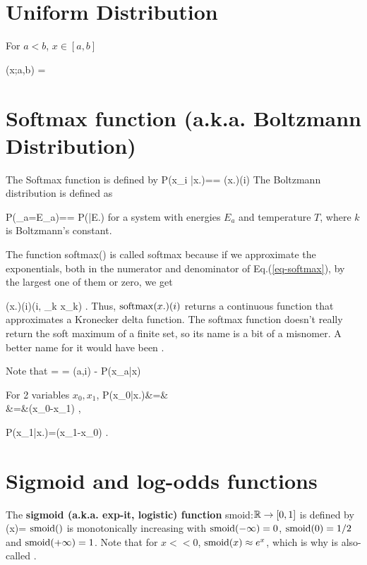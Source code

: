 \section{Uniform Distribution}
For $a<b$, $x\in [a,b]$

\beq
\calu(x;a,b) =
\eeq

\section {Softmax function
(a.k.a. Boltzmann Distribution)}

The Softmax function
 is defined by
\beq
P(x_i
|x.)==
\softmax(x.)(i)
\label{eq-softmax}
\eeq
The
Boltzmann distribution is defined as

\beq
P(\rvE_a=E_a)==
P(|E.)\eeq
for a system with energies $E_a$
and temperature $T$,
where $k$
is Boltzmann's constant.

The function
softmax() is called softmax because if we
approximate the exponentials,
 both in the numerator and denominator
of Eq.(\ref{eq-softmax}),
by the largest one
of them or zero,
we get

\beq
\softmax(x.)(i)\approx \delta(i, \argmax_k x_k)
\;.
\eeq
Thus, ${\rm softmax}(x.)(i)$
returns a continuous
function that approximates a
Kronecker delta function.
The softmax function doesn't really
return the soft maximum of a finite set, so
its name is a bit of a misnomer.
A better name for it would have been .

Note that
\beq
{}
=
\ln{}
=
\delta(a,i)
-
P(x_a|x)
\eeq

For 2 variables $x_0, x_1$,
\beqa
P(x_0|x.)&=&
\\
&=&\smoid(x_0-x_1)
\;,
\eeqa

\beq
P(x_1|x.)=\smoid(x_1-x_0)
\;.
\eeq

\section{Sigmoid and log-odds functions}
\label{sec-smoid}
The {\bf sigmoid (a.k.a. exp-it,  logistic) function} smoid:${ \mathbb{R}}\rightarrow [0,1]$
is defined by
\beq
\smoid(x)=
\eeq
${\rm smoid}()$ is monotonically
increasing with ${\rm smoid}(-\infty)=0$,
${\rm smoid}(0)=1/2$
and ${\rm smoid}(+\infty)=1$.
Note that for $x<<0$, ${\rm smoid}(x)\approx e^x$, which
is why  is also-called .

